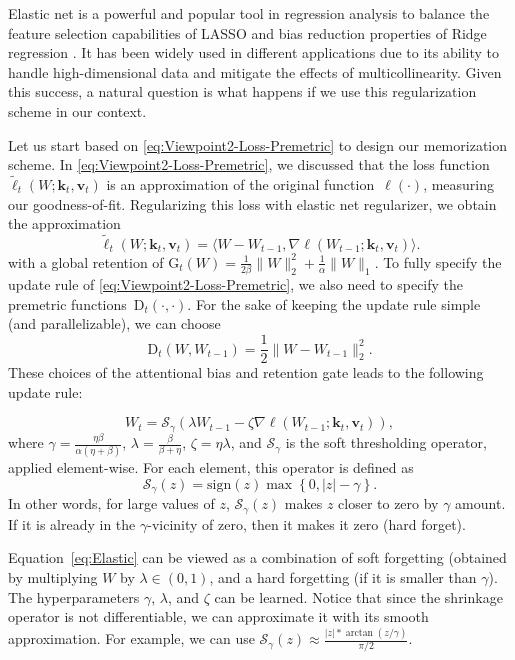 \documentclass{article}
\newcommand{\citep}{\parencite}
\newcommand{\vk}[0]{\mathbf{k}}
\newcommand{\vvv}[0]{\mathbf{v}}
\theoremstyle{plain}
\theoremstyle{definition}
\theoremstyle{remark}
\newcommand{\head}[1]{\vspace{1.7mm}\noindent{{\textcolor{c2}{\bf #1.}}}}
\begin{document}
\head{Variant 2: Elastic Net Regularization: Hard and Soft Forgetting} 
Elastic net is a powerful and popular tool in regression analysis to balance the feature selection capabilities of LASSO \citep{tibshirani1996regression} and bias reduction properties of Ridge regression \citep{hilt1977ridge,hoerl1970ridge}. It has been widely used  in different applications due to its ability to handle high-dimensional data and mitigate the effects of multicollinearity. Given this success, a natural question is what happens if we use this regularization scheme in our context. 

Let us start based on \eqref{eq:Viewpoint2-Loss-Premetric} to design our memorization scheme. In \eqref{eq:Viewpoint2-Loss-Premetric}, we discussed that the loss function $\widetilde{\ell}_t(W;\vk_t, \vvv_t)$ is an approximation of the original function~$\ell(\cdot)$, measuring our goodness-of-fit. Regularizing this loss with elastic net regularizer, we obtain the approximation
\[
\widetilde{\ell}_t(W;\vk_t, \vvv_t)= \langle W-W_{t-1},\nabla \ell(W_{t-1};\vk_t, \vvv_t) \rangle.
\]
with a global retention of $\mbox{G}_t(W) = \frac{1}{2\beta} \|W\|_2^2 + \frac{1}{\alpha} \|W\|_1$. 
To fully specify the update rule of \eqref{eq:Viewpoint2-Loss-Premetric}, we also need to specify the premetric functions~$\mbox{D}_t(\cdot,\cdot)$. For the sake of keeping the update rule simple (and parallelizable), we can choose
\[
\mbox{D}_t(W,W_{t-1}) = \frac{1}{2}\|W-W_{t-1}\|_2^2.
\]
These choices of the attentional bias and retention gate leads to the following update rule:

\begin{equation}\label{eq:Elastic}
    W_t = \mathcal{S}_{\gamma} \left( \lambda W_{t-1} - \zeta \nabla \ell(W_{t-1};\vk_t, \vvv_t)\right),
\end{equation}
where $\gamma =  \frac{\eta \beta}{\alpha(\eta + \beta)}$, $\lambda = \frac{\beta}{\beta+\eta}$, $\zeta = \eta \lambda$, and $\mathcal{S}_{\gamma}$ is the soft thresholding operator, applied element-wise. For each element,  this operator is defined as
\[
 \mathcal{S}_{\gamma}(z) = \mbox{sign}(z) \max\left\{0, |z| - \gamma\right\}.
\]
In other words, for large values of $z$, $ \mathcal{S}_{\gamma}(z)$ makes $z$ closer to zero by $\gamma$ amount. If it is already in the $\gamma$-vicinity of zero, then it makes it zero (hard forget). 

Equation~\eqref{eq:Elastic} can be viewed as a combination of soft forgetting (obtained by multiplying $W$ by $\lambda \in (0,1)$, and a hard forgetting (if it is smaller than $\gamma$). The hyperparameters $\gamma$, $\lambda$, and $\zeta$ can be learned.
Notice that since the shrinkage operator is not  differentiable, we can  approximate it with its smooth approximation. For example, we can use
$\mathcal{S}_{\gamma}(z) \approx \frac{|z| * \arctan(z / \gamma)}{\pi / 2}$.
\end{document}
